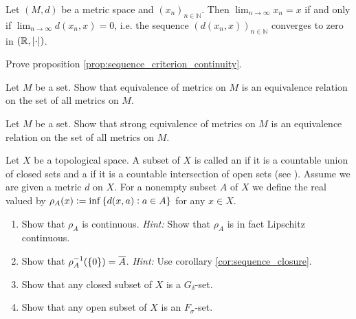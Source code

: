 \begin{exercise}
	Let $(M,d)$ be a metric space and $(x_n)_{n \in \mathbb{N}}$. Then $\lim_{n \to \infty} x_n = x$ if and only if $\lim_{n \to \infty} d(x_n,x) = 0$, i.e. the sequence $(d(x_n,x))_{n \in \mathbb{N}}$ converges to zero in $(\mathbb{R},\abs[0]{\cdot})$.
	\label{ex:convergence_sequence}
\end{exercise}

\begin{exercise}
	Prove proposition \ref{prop:sequence_criterion_continuity}.
\end{exercise}

\begin{exercise}
	Let $M$ be a set. Show that equivalence of metrics on $M$ is an equivalence relation on the set of all metrics on $M$.
\end{exercise}

\begin{exercise}
	Let $M$ be a set. Show that strong equivalence of metrics on $M$ is an equivalence relation on the set of all metrics on $M$.
\end{exercise}

\begin{exercise}
	Let $X$ be a topological space. A subset of $X$ is called an  if it is a countable union of closed sets and a  if it is a countable intersection of open sets (see \cite[61]{aliprantis:principles_of_real_analysis:1998}). Assume we are given a metric $d$ on $X$. For a nonempty subset $A$ of $X$ we define the real valued  by $\rho_A(x) := \inf\cbr[0]{d(x,a) : a \in A}$ for any $x \in X$.

	\begin{enumerate}[label = (\alph*)]
		\item Show that $\rho_A$ is continuous. \textit{Hint:} Show that $\rho_A$ is in fact Lipschitz continuous.
		\item Show that $\rho_A^{-1}(\cbr[0]{0}) = \overline{A}$. \textit{Hint:} Use corollary \ref{cor:sequence_closure}.
		\item Show that any closed subset of $X$ is a $G_\delta$-set. 
		\item Show that any open subset of $X$ is an $F_\sigma$-set.
	\end{enumerate}
\end{exercise}
